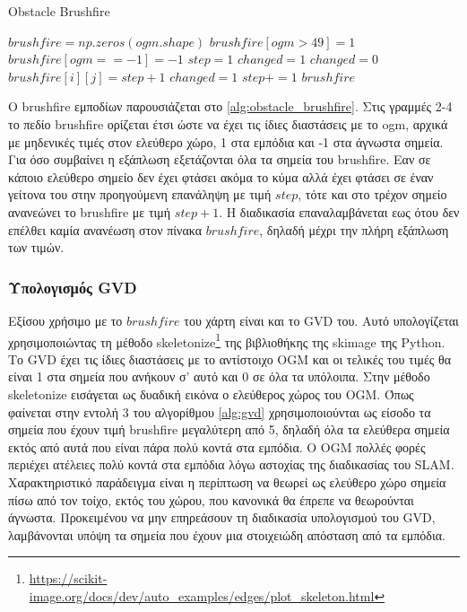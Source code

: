 \begin{algorithm}[!htb]
\caption{Obstacle Brushfire}
\label{alg:obstacle_brushfire}
\begin{algorithmic}[1]
        \State $brushfire = np.zeros(ogm.shape)$
        \State $brushfire[ogm > 49] = 1$
        \State $brushfire[ogm == -1] = -1$
        \State $step = 1$
        \State $changed = 1$
            \State $changed = 0$
                        \State $brushfire[i][j] = step + 1$
                        \State $changed = 1$
                    \EndIf
                \EndFor
            \EndFor
            \State $step += 1$
        \EndWhile
        \State \Return $brushfire$
            
\end{algorithmic}
\end{algorithm}

Ο brushfire εμποδίων παρουσιάζεται στο \ref{alg:obstacle_brushfire}. Στις γραμμές 2-4 το πεδίο brushfire ορίζεται έτσι ώστε να έχει τις ίδιες διαστάσεις με το ogm, αρχικά με μηδενικές τιμές στον ελεύθερο χώρο, 1 στα εμπόδια και -1 στα άγνωστα σημεία. Για όσο συμβαίνει η εξάπλωση εξετάζονται όλα τα σημεία του brushfire. Εαν σε κάποιο ελεύθερο σημείο δεν έχει φτάσει ακόμα το κύμα αλλά έχει φτάσει σε έναν γείτονα του στην προηγούμενη επανάληψη με τιμή $step$, τότε και στο τρέχον σημείο ανανεώνει το brushfire με τιμή $step + 1$. Η διαδικασία επαναλαμβάνεται εως ότου δεν επέλθει καμία ανανέωση στον πίνακα $brushfire$, δηλαδή μέχρι την πλήρη εξάπλωση των τιμών.

\subsubsection{Υπολογισμός GVD}
\label{subsection:gvd_algorithms}
Εξίσου χρήσιμο με το $brushfire$ του χάρτη είναι και το GVD του. Αυτό υπολογίζεται χρησιμοποιώντας τη μέθοδο skeletonize\footnote{\href{https://scikit-image.org/docs/dev/auto_examples/edges/plot_skeleton.html}{https://scikit-image.org/docs/dev/auto\_examples/edges/plot\_skeleton.html}} της βιβλιοθήκης της skimage της Python. Το GVD έχει τις ίδιες διαστάσεις με το αντίστοιχο OGM και οι τελικές του τιμές θα είναι 1 στα σημεία που ανήκουν σ' αυτό και 0 σε όλα τα υπόλοιπα. Στην μέθοδο skeletonize εισάγεται ως δυαδική εικόνα ο ελεύθερος χώρος του OGM. Όπως φαίνεται στην εντολή 3 του αλγορίθμου \ref{alg:gvd} χρησιμοποιούνται ως είσοδο τα σημεία που έχουν τιμή brushfire μεγαλύτερη από 5, δηλαδή όλα τα ελεύθερα σημεία εκτός από αυτά που είναι πάρα πολύ κοντά στα εμπόδια. Ο OGM πολλές φορές περιέχει ατέλειες πολύ κοντά στα εμπόδια λόγω αστοχίας της διαδικασίας του SLAM. Χαρακτηριστικό παράδειγμα είναι η περίπτωση να θεωρεί ως ελεύθερο χώρο σημεία πίσω από τον τοίχο, εκτός του χώρου, που κανονικά θα έπρεπε να θεωρούνται άγνωστα. Προκειμένου να μην επηρεάσουν τη διαδικασία υπολογισμού του GVD, λαμβάνονται υπόψη τα σημεία που έχουν μια στοιχειώδη απόσταση από τα εμπόδια.


